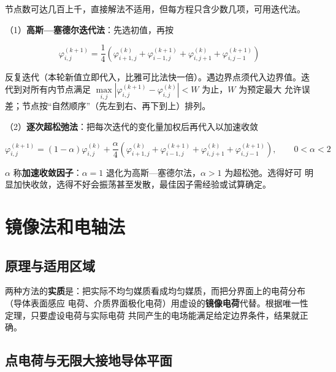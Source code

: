 节点数可达几百上千，直接解法不适用，但每方程只含少数几项，可用迭代法。

（1）\textbf{高斯—塞德尔迭代法}：先选初值，再按
\begin{formulaBox}
\[
\varphi^{(k+1)}_{i,j}=\frac{1}{4}\left(
\varphi^{(k)}_{i+1,j}+\varphi^{(k+1)}_{i-1,j}
+\varphi^{(k)}_{i,j+1}+\varphi^{(k+1)}_{i,j-1}\right)
\]
\end{formulaBox}
反复迭代（本轮新值立即代入，比雅可比法快一倍）。遇边界点须代入边界值。迭代到对所有内节点满足
$\max\limits_{i,j}\left|\varphi^{(k+1)}_{i,j}-\varphi^{(k)}_{i,j}\right|<W$ 为止，$W$ 为预定最大
允许误差；节点按“自然顺序”（先左到右、再下到上）排列。

（2）\textbf{逐次超松弛法}：把每次迭代的变化量加权后再代入以加速收敛
\begin{formulaBox}
\[
\varphi^{(k+1)}_{i,j}=(1-\alpha)\varphi^{(k)}_{i,j}
+\frac{\alpha}{4}\left(
\varphi^{(k)}_{i+1,j}+\varphi^{(k+1)}_{i-1,j}
+\varphi^{(k)}_{i,j+1}+\varphi^{(k+1)}_{i,j-1}\right),
\qquad 0<\alpha<2
\]
\end{formulaBox}
$\alpha$ 称\textbf{加速收敛因子}：$\alpha=1$ 退化为高斯—塞德尔法，$\alpha>1$ 为超松弛。选得好可
明显加快收敛，选得不好会振荡甚至发散，最佳因子需经验或试算确定。


\section{镜像法和电轴法}

\subsection{原理与适用区域}

两种方法的\textbf{实质}是：把实际不均匀媒质看成均匀媒质，而把分界面上的电荷分布（导体表面感应
电荷、介质界面极化电荷）用虚设的\textbf{镜像电荷}代替。根据唯一性定理，只要虚设电荷与实际电荷
共同产生的电场能满足给定边界条件，结果就正确。


\subsection{点电荷与无限大接地导体平面}

